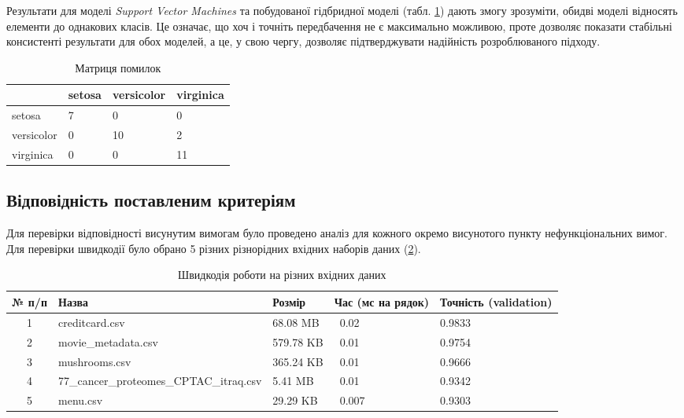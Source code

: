Результати для моделі \textit{Support Vector Machines} та побудованої гідбридної моделі (табл. \ref{tab:confusion_matrix}) дають змогу зрозуміти, обидві моделі відносять елементи до однакових класів. Це означає, що хоч і точніть передбачення не є максимально можливою, проте дозволяє показати стабільні консистенті результати для обох моделей, а це, у свою чергу, дозволяє підтверджувати надійність розроблюваного підходу.

\begin{table}[h!]
	\begin{tabularx}{\textwidth}{|X|X|X|X|}
    \hline
     & setosa & versicolor & virginica \\ \hline
    setosa & 7 & 0 & 0 \\ \hline
    versicolor & 0 & 10 & 2 \\ \hline
    virginica & 0 & 0 & 11 \\
    \hline
    \end{tabularx}
\caption{Матриця помилок} \label{tab:confusion_matrix}
\end{table}

\subsection{Відповідність поставленим критеріям}
Для перевірки відповідності висунутим вимогам було проведено аналіз для кожного окремо висунотого пункту нефункціональних вимог. Для перевірки швидкодії було обрано 5 різних різнорідних вхідних наборів даних (\ref{tab:datasets_performance}).

\begin{table}[h!]
	\begin{tabularx}{\textwidth}{|c|X|X|X|X|}
    \hline
    № п/п & Назва & Розмір & Час (мс на рядок) & Точність (validation) \\ \hline
    1 & creditcard.csv & 68.08 MB & ~0.02 & 0.9833 \\ \hline
    2 & movie\_metadata.csv & 579.78 KB & ~0.01 & 0.9754 \\ \hline
    3 & mushrooms.csv & 365.24 KB  & ~0.01 & 0.9666 \\ \hline
    4 & 77\_cancer\_proteomes\_CPTAC\_itraq.csv & 5.41 MB & ~0.01 & 0.9342 \\ \hline
    5 & menu.csv & 29.29 KB & ~0.007 & 0.9303 \\
    \hline
    \end{tabularx}
\caption{Швидкодія роботи на різних вхідних даних} \label{tab:datasets_performance}
\end{table}

